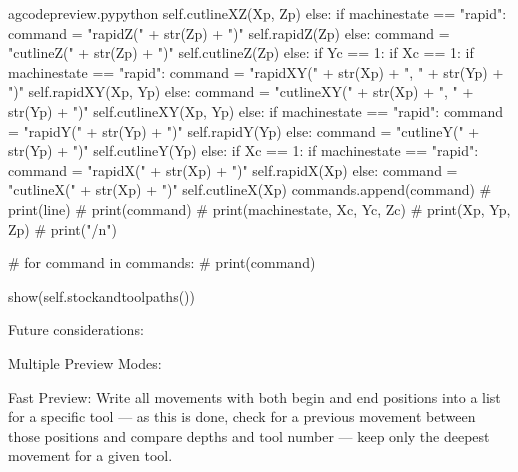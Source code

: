 \documentclass{ltxdoc}
\begin{document}
\begin{writecode}{a}{gcodepreview.py}{python}
                                self.cutlineXZ(Xp, Zp)
                        else:
                            if machinestate == "rapid":
                                command = "rapidZ(" + str(Zp) + ")"
                                self.rapidZ(Zp)
                            else: 
                                command = "cutlineZ(" + str(Zp) + ")"
                                self.cutlineZ(Zp)
                else:
                    if Yc == 1:
                        if Xc == 1:
                            if machinestate == "rapid":
                                command = "rapidXY(" + str(Xp) + ", " + str(Yp) + ")"
                                self.rapidXY(Xp, Yp)
                            else: 
                                command = "cutlineXY(" + str(Xp) + ", " + str(Yp) + ")"
                                self.cutlineXY(Xp, Yp)
                        else:
                            if machinestate == "rapid":
                                command = "rapidY(" + str(Yp) + ")"
                                self.rapidY(Yp)
                            else: 
                                command = "cutlineY(" + str(Yp) + ")"
                                self.cutlineY(Yp)
                    else:
                        if Xc == 1:
                            if machinestate == "rapid":
                                command = "rapidX(" + str(Xp) + ")"
                                self.rapidX(Xp)
                            else: 
                                command = "cutlineX(" + str(Xp) + ")"
                                self.cutlineX(Xp)
                commands.append(command)
#                print(line)
#                print(command)
#                print(machinestate, Xc, Yc, Zc)
#                print(Xp, Yp, Zp)
#                print("/n")

#        for command in commands:
#            print(command)

        show(self.stockandtoolpaths())

\end{writecode}
\addtocounter{gcpy}{137}

Future considerations:

Multiple Preview Modes:

Fast Preview: Write all movements with both begin and end positions into a list for a specific tool --- as this is done, check for a previous movement between those positions and compare depths and tool number --- keep only the deepest movement for a given tool.
\end{document}
